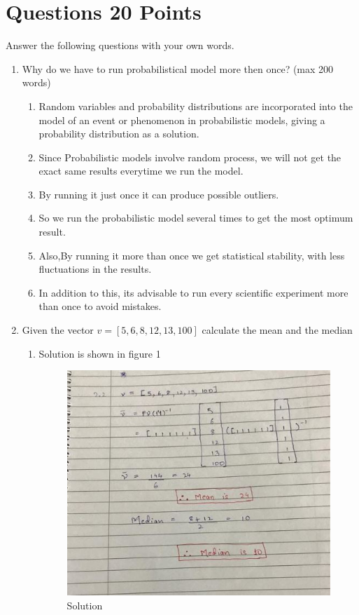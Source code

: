 \documentclass{resources/WeSTassignment}
\begin{document}
\section{Questions \hfill{20 Points}}
Answer the following questions with your own words.  
\begin{enumerate}
    \item Why do we have to run probabilistical model more then once? (max 200 words)
    \begin{enumerate}
    \item Random variables and probability distributions are incorporated into the model of an event or phenomenon in probabilistic models, giving a probability distribution as a solution.
    \item Since Probabilistic models involve random process, we will not get the exact same results everytime we run the model.
	\item By running it just once it can produce possible outliers.
	\item So we run the probabilistic model several times to get the most optimum result.
	\item Also,By running it more than once we get statistical stability, with less fluctuations in the results.
	\item In addition to this, its advisable to run every scientific experiment more than once to avoid mistakes.
	\end{enumerate}
    \item Given the vector $v = [5,6,8,12,13,100]$ calculate the mean and the median
    \begin{enumerate}
    \item Solution is shown in figure 1 \begin{figure}[h]
    \centering
    \includegraphics[scale=1]{resources/vector.JPG}
    \caption{Solution}  
    \label{fig:Solution}
\end{figure}
    \end{enumerate}
    

\end{enumerate}
\end{document}
